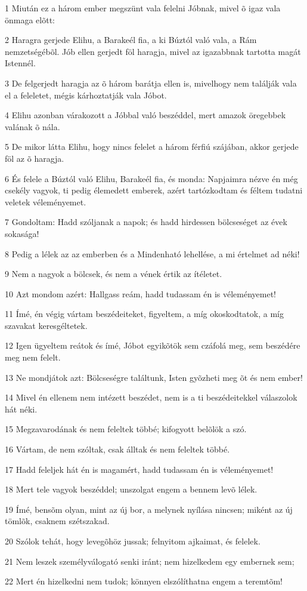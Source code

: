 \par 1 Miután ez a három ember megszünt vala felelni Jóbnak, mivel õ igaz vala önmaga elõtt:
\par 2 Haragra gerjede Elihu, a Barakeél fia, a ki Búztól való vala, a Rám nemzetségébõl. Jób ellen gerjedt föl haragja, mivel az igazabbnak tartotta magát Istennél.
\par 3 De felgerjedt haragja az õ három barátja ellen is, mivelhogy nem találják vala el a feleletet, mégis kárhoztatják vala Jóbot.
\par 4 Elihu azonban várakozott a Jóbbal való beszéddel, mert amazok öregebbek valának õ nála.
\par 5 De mikor látta Elihu, hogy nincs felelet a három férfiú szájában, akkor gerjede föl az õ haragja.
\par 6 És felele a Búztól való Elihu, Barakeél fia, és monda: Napjaimra nézve én még csekély vagyok, ti pedig élemedett emberek, azért tartózkodtam és féltem tudatni veletek véleményemet.
\par 7 Gondoltam: Hadd szóljanak a napok; és hadd hirdessen bölcseséget az évek sokasága!
\par 8 Pedig a lélek az az emberben és a Mindenható lehellése, a mi értelmet ad néki!
\par 9 Nem a nagyok a bölcsek, és nem a vének értik az ítéletet.
\par 10 Azt mondom azért: Hallgass reám, hadd tudassam én is véleményemet!
\par 11 Ímé, én végig vártam beszédeiteket, figyeltem, a míg okoskodtatok, a míg szavakat keresgéltetek.
\par 12 Igen ügyeltem reátok és ímé, Jóbot egyikõtök sem czáfolá meg, sem beszédére meg nem felelt.
\par 13 Ne mondjátok azt: Bölcseségre találtunk, Isten gyõzheti meg õt és nem ember!
\par 14 Mivel én ellenem nem intézett beszédet, nem is a ti beszédeitekkel válaszolok hát néki.
\par 15 Megzavarodának és nem feleltek többé; kifogyott belõlök a szó.
\par 16 Vártam, de nem szóltak, csak álltak és nem feleltek többé.
\par 17 Hadd feleljek hát én is magamért, hadd tudassam én is véleményemet!
\par 18 Mert tele vagyok beszéddel; unszolgat engem a bennem levõ lélek.
\par 19 Ímé, bensõm olyan, mint az új bor, a melynek nyílása nincsen; miként az új tömlõk, csaknem szétszakad.
\par 20 Szólok tehát, hogy levegõhöz jussak; felnyitom ajkaimat, és felelek.
\par 21 Nem leszek személyválogató senki iránt; nem hizelkedem egy embernek sem;
\par 22 Mert én hizelkedni nem tudok; könnyen elszólíthatna engem a teremtõm!

